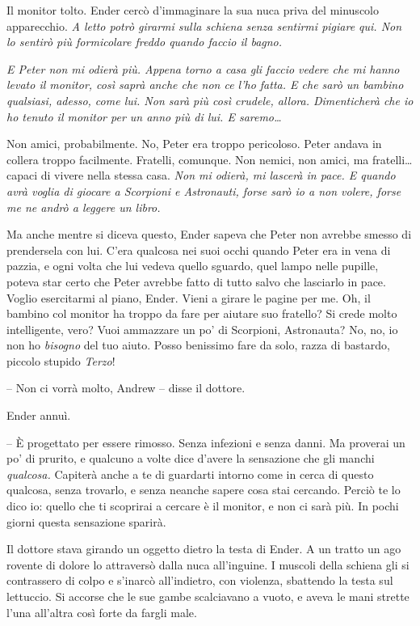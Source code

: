 {Il monitor tolto. Ender cercò d'immaginare la sua nuca priva del
	minuscolo apparecchio. \emph{A letto potrò girarmi sulla schiena senza
		sentirmi pigiare qui. Non lo sentirò più formicolare freddo quando
		faccio il bagno.}}

\emph{{E Peter non mi odierà più. Appena torno a casa gli faccio vedere
		che mi hanno levato il monitor, così saprà anche che non ce l'ho fatta.
		E che sarò un bambino qualsiasi, adesso, come lui. Non sarà più così
		crudele, allora. Dimenticherà che io ho tenuto il monitor per un anno
		più di lui. E saremo\ldots{}}}

{Non amici, probabilmente. No, Peter era troppo pericoloso. Peter andava
	in collera troppo facilmente. Fratelli, comunque. Non nemici, non amici,
	ma fratelli\ldots{} capaci di vivere nella stessa casa. \emph{Non mi
		odierà, mi lascerà in pace. E quando avrà voglia di giocare a Scorpioni
		e Astronauti, forse sarò io a non volere, forse me ne andrò a leggere un
		libro.}}

{Ma anche mentre si diceva questo, Ender sapeva che Peter non avrebbe
	smesso di prendersela con lui. C'era qualcosa nei suoi occhi quando
	Peter era in vena di pazzia, e ogni volta che lui vedeva quello sguardo,
	quel lampo nelle pupille, poteva star certo che Peter avrebbe fatto di
	tutto salvo che lasciarlo in pace. Voglio esercitarmi al piano, Ender.
	Vieni a girare le pagine per me. Oh, il bambino col monitor ha troppo da
	fare per aiutare suo fratello? Si crede molto intelligente, vero? Vuoi
	ammazzare un po' di Scorpioni, Astronauta? No, no, io non ho
	\emph{bisogno} del tuo aiuto. Posso benissimo fare da solo, razza di
	bastardo, piccolo stupido \emph{Terzo}!}

{-- Non ci vorrà molto, Andrew -- disse il dottore.}

{Ender annuì.}

{-- È progettato per essere rimosso. Senza infezioni e senza danni. Ma
	proverai un po' di prurito, e qualcuno a volte dice d'avere la
	sensazione che gli manchi \emph{qualcosa.} Capiterà anche a te di
	guardarti intorno come in cerca di questo qualcosa, senza trovarlo, e
	senza neanche sapere cosa stai cercando. Perciò te lo dico io: quello
	che ti scoprirai a cercare è il monitor, e non ci sarà più. In pochi
	giorni questa sensazione sparirà.}

{Il dottore stava girando un oggetto dietro la testa di Ender. A un
	tratto un ago rovente di dolore lo attraversò dalla nuca all'inguine. I
	muscoli della schiena gli si contrassero di colpo e s'inarcò
	all'indietro, con violenza, sbattendo la testa sul lettuccio. Si accorse
	che le sue gambe scalciavano a vuoto, e aveva le mani strette l'una
	all'altra così forte da fargli male.}

